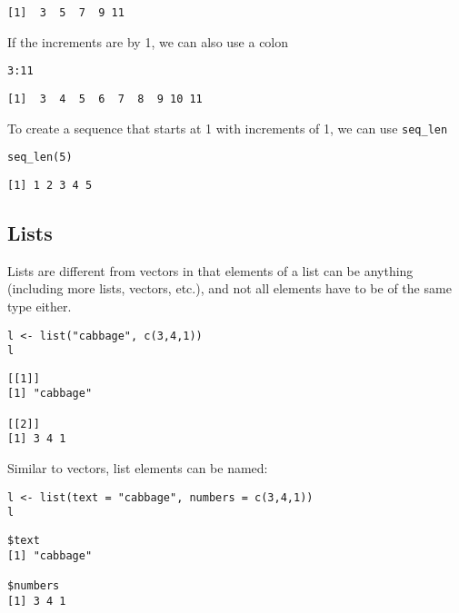 \documentclass[11pt,a4paper]{article}
\begin{document}
\begin{verbatim}
[1]  3  5  7  9 11
\end{verbatim}

If the increments are by 1, we can also use a colon \\

\begin{verbatim}
3:11
\end{verbatim}

\begin{verbatim}
[1]  3  4  5  6  7  8  9 10 11
\end{verbatim}

To create a sequence that starts at 1 with increments of 1, we can use \texttt{seq\_len} \\

\begin{verbatim}
seq_len(5)
\end{verbatim}

\begin{verbatim}
[1] 1 2 3 4 5
\end{verbatim}

\subsection{Lists}
\label{sec-2-2}

Lists are different from vectors in that elements of a list can be anything (including more lists, vectors, etc.), and not all elements have to be of the same type either. \\

\begin{verbatim}
l <- list("cabbage", c(3,4,1))
l
\end{verbatim}

\begin{verbatim}
[[1]]
[1] "cabbage"

[[2]]
[1] 3 4 1
\end{verbatim}

Similar to vectors, list elements can be named: \\

\begin{verbatim}
l <- list(text = "cabbage", numbers = c(3,4,1))
l
\end{verbatim}

\begin{verbatim}
$text
[1] "cabbage"

$numbers
[1] 3 4 1
\end{verbatim}
\end{document}
